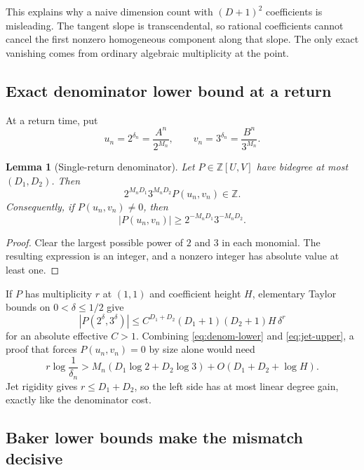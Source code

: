 \documentclass[11pt]{article}
\newtheorem{lemma}[theorem]{Lemma}
\theoremstyle{definition}
\theoremstyle{remark}
\newcommand{\ZZ}{\mathbb Z}
\begin{document}
This explains why a naive dimension count with $(D+1)^2$ coefficients is misleading. The tangent slope is transcendental, so rational coefficients cannot cancel the first nonzero homogeneous component along that slope. The only exact vanishing comes from ordinary algebraic multiplicity at the point.

\subsection{Exact denominator lower bound at a return}

At a return time, put
\[
 u_n=2^{\delta_n}=\frac{A^n}{2^{M_n}},
 \qquad
 v_n=3^{\delta_n}=\frac{B^n}{3^{M_n}}.
\]

\begin{lemma}[Single-return denominator]\label{lem:single-denom}
Let $P\in\ZZ[U,V]$ have bidegree at most $(D_1,D_2)$. Then
\[
 2^{M_nD_1}3^{M_nD_2}P(u_n,v_n)\in\ZZ.
\]
Consequently, if $P(u_n,v_n)\ne0$, then
\begin{equation}\label{eq:denom-lower}
 |P(u_n,v_n)|\ge 2^{-M_nD_1}3^{-M_nD_2}.
\end{equation}
\end{lemma}

\begin{proof}
Clear the largest possible power of $2$ and $3$ in each monomial. The resulting expression is an integer, and a nonzero integer has absolute value at least one.
\end{proof}

If $P$ has multiplicity $r$ at $(1,1)$ and coefficient height $H$, elementary Taylor bounds on $0<\delta\le1/2$ give
\begin{equation}\label{eq:jet-upper}
 |P(2^\delta,3^\delta)|
 \le C^{D_1+D_2}(D_1+1)(D_2+1)H\,\delta^r
\end{equation}
for an absolute effective $C>1$. Combining \eqref{eq:denom-lower} and \eqref{eq:jet-upper}, a proof that forces $P(u_n,v_n)=0$ by size alone would need
\begin{equation}\label{eq:single-return-needed}
 r\log\frac1{\delta_n}
 >M_n(D_1\log2+D_2\log3)
 +O(D_1+D_2+\log H).
\end{equation}
Jet rigidity gives $r\le D_1+D_2$, so the left side has at most linear degree gain, exactly like the denominator cost.

\subsection{Baker lower bounds make the mismatch decisive}
\end{document}

